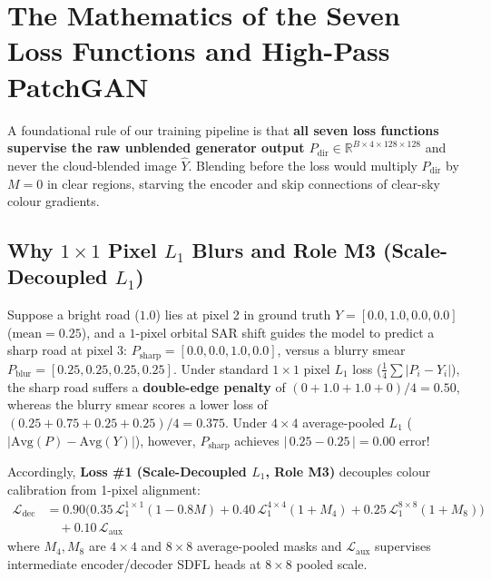 \documentclass[12pt,a4paper]{report}
\begin{document}
\section{The Mathematics of the Seven Loss Functions and High-Pass PatchGAN}
A foundational rule of our training pipeline is that \textbf{all seven loss functions supervise the raw unblended generator output $P_{\text{dir}} \in \mathbb{R}^{B\times 4\times 128\times 128}$} and never the cloud-blended image $\hat{Y}$. Blending before the loss would multiply $P_{\text{dir}}$ by $M=0$ in clear regions, starving the encoder and skip connections of clear-sky colour gradients.

\subsection{Why $1\times 1$ Pixel $L_1$ Blurs and Role M3 (Scale-Decoupled $L_1$)}
Suppose a bright road ($1.0$) lies at pixel 2 in ground truth $Y = [0.0, 1.0, 0.0, 0.0]$ ($\text{mean} = 0.25$), and a $1\text{-pixel}$ orbital SAR shift guides the model to predict a sharp road at pixel 3: $P_{\text{sharp}} = [0.0, 0.0, 1.0, 0.0]$, versus a blurry smear $P_{\text{blur}} = [0.25, 0.25, 0.25, 0.25]$. Under standard $1\times 1$ pixel $L_1$ loss ($\frac{1}{4}\sum |P_i - Y_i|$), the sharp road suffers a \textbf{double-edge penalty} of $(0 + 1.0 + 1.0 + 0)/4 = \mathbf{0.50}$, whereas the blurry smear scores a lower loss of $(0.25 + 0.75 + 0.25 + 0.25)/4 = \mathbf{0.375}$. Under $4\times 4$ average-pooled $L_1$ ($|\text{Avg}(P) - \text{Avg}(Y)|$), however, $P_{\text{sharp}}$ achieves $|\,0.25 - 0.25\,| = \mathbf{0.00}$ error!

Accordingly, \textbf{Loss \#1 (Scale-Decoupled $L_1$, Role M3)} decouples colour calibration from 1-pixel alignment:
\begin{equation}
\begin{aligned}
    \mathcal{L}_{\text{dec}} &= 0.90\Big(0.35\,\mathcal{L}_1^{1\times 1}(1 - 0.8M) + 0.40\,\mathcal{L}_1^{4\times 4}(1 + M_4) + 0.25\,\mathcal{L}_1^{8\times 8}(1 + M_8)\Big) \\
    &\quad + 0.10\,\mathcal{L}_{\text{aux}}
\end{aligned}
\label{eq:scale_dec_l1}
\end{equation}
where $M_4, M_8$ are $4\times 4$ and $8\times 8$ average-pooled masks and $\mathcal{L}_{\text{aux}}$ supervises intermediate encoder/decoder SDFL heads at $8\times 8$ pooled scale.
\end{document}
